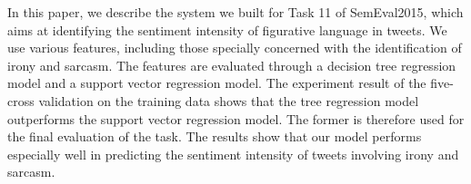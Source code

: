 In this paper, we describe the system we built for Task 11 of SemEval2015, which aims at identifying the sentiment intensity of figurative language in tweets. We use various features, including those specially concerned with the identification of irony and sarcasm. The features are evaluated through a decision tree regression model and a support vector regression model. The experiment result of the five-cross validation on the training data shows that the tree regression model outperforms the support vector regression model. The former is therefore used for the final evaluation of the task. The results show that our model performs especially well in predicting the sentiment intensity of tweets involving irony and sarcasm.
